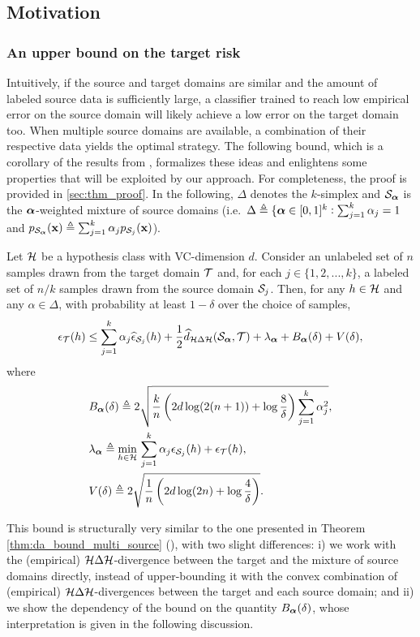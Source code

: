 \subsection{Motivation}

\subsubsection{An upper bound on the target risk}

Intuitively, if the source and target domains are similar and the amount of labeled source data is sufficiently large, a classifier trained to reach low empirical error on the source domain will likely achieve a low error on the target domain too. When multiple source domains are available, a combination of their respective data yields the optimal strategy. The following bound, which is a corollary of the results from \citet{BenDavid2010}, formalizes these ideas and enlightens some properties that will be exploited by our approach. For completeness, the proof is provided in \ref{sec:thm_proof}. In the following, $\Delta$ denotes the $k$-simplex and ${\mathcal{S}}_{{\bm{\alpha}}}$ is the ${\bm{\alpha}}$-weighted mixture of source domains (i.e.\ $\Delta \triangleq \lbrace {\bm{\alpha}} \in [0,1]^k: \sum_{j=1}^{k} \alpha_j = 1$ and  $p_{{\mathcal{S}}_{{\bm{\alpha}}}}({\mathbf{x}}) \triangleq \sum_{j=1}^{k} {\alpha}_j p_{{\mathcal{S}}_j}({\mathbf{x}})$).

\begin{theorem}
	\label{thm:target_risk_bound}
	Let ${\mathcal{H}}$ be a hypothesis class with VC-dimension $d$. Consider an unlabeled set of $n$ samples drawn from the target domain ${\mathcal{T}}$ and, for each $j \in \{1,2,...,k\}$, a labeled set of $n/k$ samples drawn from the source domain ${\mathcal{S}}_j$. Then, for any $h \in {\mathcal{H}}$ and any $\alpha \in \Delta$, with probability at least $1-\delta$ over the choice of samples,
	\begin{equation}
	\label{eq:bound}
	\epsilon_{\mathcal{T}}(h) \leq \sum_{j=1}^k \alpha_j \widehat{\epsilon}_{{\mathcal{S}}_j}(h) + \frac{1}{2} \widehat{d}_{{\mathcal{H}} \Delta {\mathcal{H}}}({\mathcal{S}}_{\bm{\alpha}}, {\mathcal{T}}) + \lambda_{\bm{\alpha}} + B_{\bm{\alpha}}(\delta) + V(\delta),
	\end{equation}
	where
	\begin{align}
	&B_{\bm{\alpha}}(\delta) \triangleq 2\sqrt{\frac{k}{n}\left(2d \log(2(n+1)) + \log\frac{8}{\delta}\right)\sum_{j=1}^k {\alpha}_j^2}, \\
	&\lambda_{\bm{\alpha}} \triangleq \min_{h \in {\mathcal{H}}}\, \sum_{j=1}^k {\alpha}_j \epsilon_{{\mathcal{S}}_j}(h) + \epsilon_{{\mathcal{T}}}(h), \\
	&V(\delta) \triangleq 2 \sqrt{\frac{1}{n} \left( 2d\log(2n) + \log\frac{4}{\delta} \right)}.
	\end{align}
\end{theorem}
This bound is structurally very similar to the one presented in Theorem \ref{thm:da_bound_multi_source} (\citet{Zhao2018}), with two slight differences: i) we work with the (empirical) ${\mathcal{H}} \Delta {\mathcal{H}}$-divergence between the target and the mixture of source domains directly, instead of upper-bounding it with the convex combination of (empirical) ${\mathcal{H}} \Delta {\mathcal{H}}$-divergences between the target and each source domain; and ii) we show the dependency of the bound on the quantity $B_{\bm{\alpha}}(\delta)$, whose interpretation is given in the following discussion.

